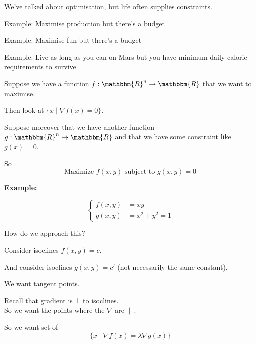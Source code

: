 
\usepackage{epsfig}
\usepackage{bbm}










We've talked about optimisation, but life often supplies constraints.

Example: Maximise production but there's a budget

Example: Maximise fun but there's a budget

Example: Live as long as you can on Mars but you have minimum daily
calorie requirements to survive

\bigskip

Suppose we have a function $f : \mathbbm{R}^n \rightarrow
\mathbbm{R}$ that we want to maximise.

Then look at $\{x\mid \nabla f(x) = 0 \}$.

\medskip

Suppose moreover that we have another function $g : \mathbbm{R}^n
\rightarrow \mathbbm{R}$ and that we have some constraint like
$g(x)=0$.

So
\begin{displaymath}
  \mbox{Maximize } f(x,y) \mbox{ subject to } g(x,y) = 0
\end{displaymath}

\textbf{Example:}

\begin{equation}
\begin{cases}
  f(x,y) & = xy \\
  g(x,y) & = x^2 + y^2 = 1
\end{cases}
\end{equation}

How do we approach this?

Consider isoclines $f(x,y) = c$.

And consider isoclines $g(x,y) = c'$ (not necessarily the same
constant).

We want tangent points.

Recall that gradient is $\bot$ to isoclines.\\
So we want the points where the $\nabla$ are $\parallel$.

So we want set of
\begin{displaymath}
  \{ x \mid \nabla f(x) = \lambda \nabla g(x) \}
\end{displaymath}

